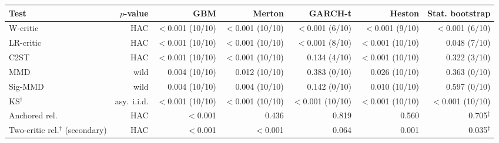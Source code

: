 \begin{tabular}{lrrrrrr}
\toprule
Test & $p$-value & GBM & Merton & GARCH-t & Heston & Stat. bootstrap \\
\midrule
W-critic & HAC & $<$0.001 (10/10) & $<$0.001 (10/10) & $<$0.001 (6/10) & $<$0.001 (9/10) & $<$0.001 (6/10) \\
LR-critic & HAC & $<$0.001 (10/10) & $<$0.001 (10/10) & $<$0.001 (8/10) & $<$0.001 (10/10) & 0.048 (7/10) \\
C2ST & HAC & $<$0.001 (10/10) & $<$0.001 (10/10) & 0.134 (4/10) & $<$0.001 (10/10) & 0.322 (3/10) \\
MMD & wild & 0.004 (10/10) & 0.012 (10/10) & 0.383 (0/10) & 0.026 (10/10) & 0.363 (0/10) \\
Sig-MMD & wild & 0.004 (10/10) & 0.004 (10/10) & 0.142 (0/10) & 0.010 (10/10) & 0.597 (0/10) \\
KS$^{\dagger}$ & asy.\ i.i.d. & $<$0.001 (10/10) & $<$0.001 (10/10) & $<$0.001 (10/10) & $<$0.001 (10/10) & $<$0.001 (10/10) \\
Anchored rel. & HAC & $<$0.001 & 0.436 & 0.819 & 0.560 & 0.705$^{\ddagger}$ \\
Two-critic rel.$^{\dagger}$ (secondary) & HAC & $<$0.001 & $<$0.001 & 0.064 & 0.001 & 0.035$^{\ddagger}$ \\
\bottomrule
\end{tabular}
